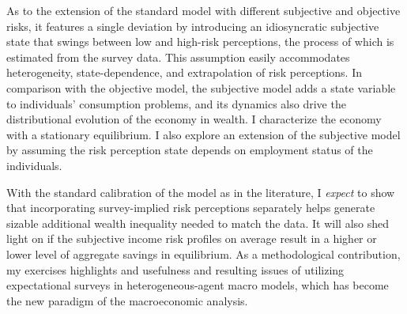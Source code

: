 As to the extension of the standard model with different subjective and objective risks, it features a single deviation by introducing an idiosyncratic subjective state that swings between low and high-risk perceptions, the process of which is estimated from the survey data. This assumption easily accommodates heterogeneity, state-dependence, and extrapolation of risk perceptions. In comparison with the objective model, the subjective model adds a state variable to individuals' consumption problems, and its dynamics also drive the distributional evolution of the economy in wealth. I characterize the economy with a stationary equilibrium. I also explore an extension of the subjective model by assuming the risk perception state depends on employment status of the individuals. 

With the standard calibration of the model as in the literature, I \emph{expect} to show that incorporating survey-implied risk perceptions separately helps generate sizable additional wealth inequality needed to match the data. It will also shed light on if the subjective income risk profiles on average result in a higher or lower level of aggregate savings in equilibrium. As a methodological contribution, my exercises highlights and usefulness and resulting issues of utilizing expectational surveys in heterogeneous-agent macro models, which has become the new paradigm of the macroeconomic analysis. 




